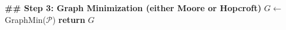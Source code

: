 {\begin{algorithm}
\begin{algorithmic}[1]
      	\EndFor
      	\State \textbf{\#\# Step 3: Graph Minimization (either Moore or Hopcroft)}
      	\State $G \gets$ GraphMin($\mathcal{P}$)
      	\State \textbf{return} $G$
      \EndProcedure
    \end{algorithmic}
  \end{algorithm}
%
%
%
%
%
}
